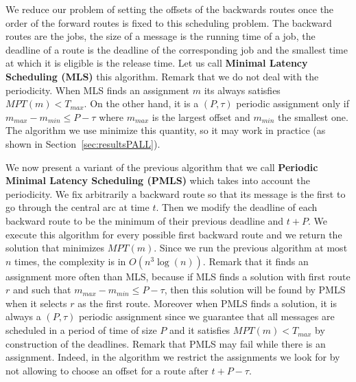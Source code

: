 \documentclass[10pt, conference, letterpaper]{IEEEtran}
\begin{document}
     We reduce our problem of setting the offsets of the backwards routes once the order of the forward routes is fixed to this
     scheduling problem. The backward routes are the jobs, the size of a message is the running time of a job,
     the deadline of a route is the deadline of the corresponding job and the smallest time at which it is eligible is the release time. Let us call {\bf Minimal Latency Scheduling (MLS)} this algorithm.
     Remark that we do not deal with the periodicity. When MLS finds an assignment $m$ its always satisfies $MPT(m) < T_{max}$. On the other hand, it is a $(P,\tau)$ periodic assignment only if $m_{max} - m_{min} \leq P -\tau$ where $m_{max}$ is the largest offset and $m_{min}$ the smallest one. The algorithm we use minimize this quantity, so it may work in practice (as shown in Section~\ref{sec:resultsPALL}).
     
     We now present a variant of the previous algorithm that we call {\bf Periodic Minimal Latency Scheduling (PMLS)}
     which takes into account the periodicity. We fix arbitrarily a backward route so that its message is the first to go through the central arc at time $t$. Then we modify the deadline of each backward route to be the minimum of their previous deadline and $t + P$.  We execute this algorithm for every possible first backward route and we return the solution that minimizes $MPT(m)$. Since we run the previous algorithm at most $n$ times, the complexity is in $O(n^3\log(n))$. Remark that it finds an assignment more often than MLS, because if MLS finds a solution with first route $r$ and such that $m_{max} - m_{min} \leq P -\tau$, then this solution will be found by PMLS when it selects $r$ as the first route. Moreover when PMLS finds a solution, it is always a $(P,\tau)$ periodic assignment since we guarantee that all messages are scheduled in a period of time of size $P$ and it satisfies $MPT(m) < T_{max}$ by construction of the deadlines. Remark that PMLS may fail while there is an assignment. Indeed, in the algorithm we restrict the assignments we look for by not allowing to choose an offset for a route after $t+P- \tau$.
     
%   
%     
% 
%     
% 
% 
\end{document}
